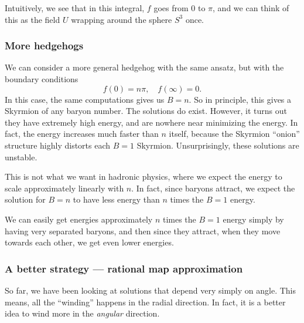 \documentclass[a4paper]{article}
\begin{document}
Intuitively, we see that in this integral, $f$ goes from $0$ to $\pi$, and we can think of this as the field $U$ wrapping around the sphere $S^3$ once.

\subsubsection*{More hedgehogs}
We can consider a more general hedgehog with the same ansatz, but with the boundary conditions
\[
  f(0) = n\pi,\quad f(\infty) = 0.
\]
In this case, the same computations gives us $B = n$. So in principle, this gives a Skyrmion of any baryon number. The solutions do exist. However, it turns out they have extremely high energy, and are nowhere near minimizing the energy. In fact, the energy increases much faster than $n$ itself, because the Skyrmion ``onion'' structure highly distorts each $B = 1$ Skyrmion. Unsurprisingly, these solutions are unstable.

This is not what we want in hadronic physics, where we expect the energy to scale approximately linearly with $n$. In fact, since baryons attract, we expect the solution for $B = n$ to have less energy than $n$ times the $B = 1$ energy.

We can easily get energies approximately $n$ times the $B = 1$ energy simply by having very separated baryons, and then since they attract, when they move towards each other, we get even lower energies.


\subsubsection*{A better strategy --- rational map approximation}
So far, we have been looking at solutions that depend very simply on angle. This means, all the ``winding'' happens in the radial direction. In fact, it is a better idea to wind more in the \emph{angular} direction.
\end{document}
